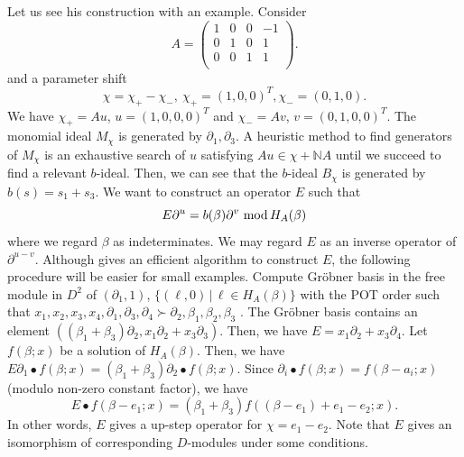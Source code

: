 \documentclass{article}
\def\NN{\mathbb{N}}
\def\pd#1{\partial_{#1}}
\begin{document}
Let us see his construction with an example.
Consider  
\begin{equation}  \label{eq:A-of-gauss1}
 A=\left(\begin{array}{cccc}
 1 & 0 & 0 &-1 \\
 0 & 1 & 0 & 1 \\
 0 & 0 & 1 & 1 \\
\end{array} \right).
\end{equation}
and a parameter shift 
\begin{equation}
\chi=\chi_+ - \chi_-, \ \chi_+=(1,0,0)^T, \chi_-=(0,1,0).
\end{equation}
We have
$\chi_+ = A u$, $u=(1,0,0,0)^T$ and
$\chi_- = A v$, $v=(0,1,0,0)^T$.
The monomial ideal $M_\chi$ \cite[(4.13)]{saito-isom} is generated 
by $\pd{1}, \pd{3}$.
A heuristic method to find generators of $M_\chi$
is an exhaustive search of $u$
satisfying $Au \in \chi+\NN A$
until we succeed to find a relevant $b$-ideal.
Then, we can see that the $b$-ideal $B_\chi$ \cite[(4,14)]{saito-isom}
is generated by $b(s)=s_1+s_3$.
We want to construct an operator $E$ such that
\begin{equation}
  E \pd{}^u = b(\beta) \pd{}^v \ {\rm mod}\, H_A(\beta)
\end{equation}
where we regard $\beta$ as indeterminates.
We may regard $E$ as an inverse operator of $\pd{}^{u-v}$.
Although \cite[Alg 4.2]{saito-isom} gives an efficient algorithm to construct $E$,
the following procedure will be easier for small examples.
Compute Gr\"obner basis in the free module in $D^2$ of
$(\pd{1},1)$, $\{ (\ell,0)\,|\, \ell \in H_A(\beta) \}$
with the POT order such that $x_1,x_2,x_3,x_4, \pd{1},\pd{3},\pd{4} \succ \pd{2}, \beta_1, \beta_2, \beta_3$ \cite{nakayama-2024}.
The Gr\"obner basis contains an element
$((\beta_1+\beta_3)\pd{2},x_1\pd{2}+x_3\pd{3})$.
Then, we have $E=x_1\pd{2}+x_3\pd{4}$.
Let $f(\beta;x)$ be a solution of $H_A(\beta)$.
Then, we have
$ E \pd{1} \bullet f(\beta;x)= (\beta_1+\beta_3) \pd{2} \bullet f(\beta;x)$.
Since $\pd{i} \bullet f(\beta;x)=f(\beta-a_i;x)$ (modulo non-zero constant factor), we have
\begin{equation}
 E \bullet f(\beta-e_1;x)= (\beta_1+\beta_3) f((\beta-e_1)+e_1-e_2;x).
\end{equation}
In other words, $E$ gives a up-step operator for $\chi=e_1-e_2$.
Note that $E$ gives an isomorphism of corresponding $D$-modules
under some conditions.
\end{document}
